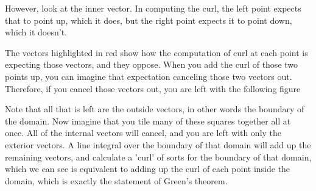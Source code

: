 \documentclass{article}
\begin{document}
    However, look at the inner vector.
    In computing the curl, the left point expects that to point up, which it does,
    but the right point expects it to point down, which it doesn't.
    \begin{figure}[!h]
        \centering
    \end{figure}
    The vectors highlighted in red show how the computation of curl at each point is expecting those vectors, and they oppose.
    When you add the curl of those two points up, you can imagine that expectation canceling those two vectors out.
    Therefore, if you cancel those vectors out, you are left with the following figure
    \begin{figure}[!h]
        \centering
    \end{figure}
    Note that all that is left are the outside vectors, in other words the boundary of the domain.
    Now imagine that you tile many of these squares together all at once.
    All of the internal vectors will cancel, and you are left with only the exterior vectors.
    A line integral over the boundary of that domain will add up the remaining vectors, and calculate a 'curl' of sorts
    for the boundary of that domain, which we can see is equivalent to adding up the curl of each point inside the domain,
    which is exactly the statement of Green's theorem.
\end{document}
